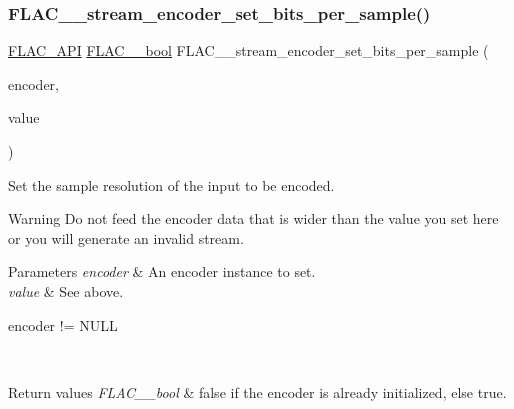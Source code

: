\subsubsection{\texorpdfstring{F\+L\+A\+C\+\_\+\+\_\+stream\+\_\+encoder\+\_\+set\+\_\+bits\+\_\+per\+\_\+sample()}{FLAC\_\_stream\_encoder\_set\_bits\_per\_sample()}}
{\footnotesize\ttfamily \hyperlink{group__flac__export_ga56ca07df8a23310707732b1c0007d6f5}{F\+L\+A\+C\+\_\+\+A\+PI} \hyperlink{ordinals_8h_a95103469f1cbd78b8cf250194985b34e}{F\+L\+A\+C\+\_\+\+\_\+bool} F\+L\+A\+C\+\_\+\+\_\+stream\+\_\+encoder\+\_\+set\+\_\+bits\+\_\+per\+\_\+sample (\begin{DoxyParamCaption}\item[{\hyperlink{struct_f_l_a_c_____stream_encoder}{F\+L\+A\+C\+\_\+\+\_\+\+Stream\+Encoder} $\ast$}]{encoder,  }\item[{unsigned}]{value }\end{DoxyParamCaption})}

Set the sample resolution of the input to be encoded.

\begin{DoxyWarning}{Warning}
Do not feed the encoder data that is wider than the value you set here or you will generate an invalid stream.
\end{DoxyWarning}
{} 
\begin{DoxyParams}{Parameters}
{\em encoder} & An encoder instance to set. \\
\hline
{\em value} & See above.  
\begin{DoxyCode}
encoder != NULL 
\end{DoxyCode}
 \\
\hline
\end{DoxyParams}

\begin{DoxyRetVals}{Return values}
{\em F\+L\+A\+C\+\_\+\+\_\+bool} & {\ttfamily false} if the encoder is already initialized, else {\ttfamily true}. \\
\hline
\end{DoxyRetVals}
\mbox{\label{group__flac__stream__encoder_gae6c001cd7601192334c58ee3631b571f}} 
